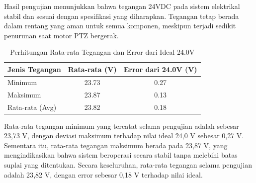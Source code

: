 Hasil pengujian menunjukkan bahwa tegangan 24VDC pada sistem elektrikal stabil
dan sesuai dengan spesifikasi yang diharapkan. Tegangan tetap berada dalam rentang
yang aman untuk semua komponen, meskipun terjadi sedikit penurunan saat motor
PTZ bergerak. 

\begin{table}[H]
	\centering
	\caption{Perhitungan Rata-rata Tegangan dan Error dari Ideal 24.0V}
	\label{tab:rata_rata_error}
	\begin{tabular}{|l|c|c|}
		\hline
		\textbf{Jenis Tegangan} & \textbf{Rata-rata (V)} & \textbf{Error dari 24.0V (V)} \\
		\hline
		Minimum                 & 23.73                  & 0.27                          \\
		Maksimum                & 23.87                  & 0.13                          \\
		Rata-rata (Avg)         & 23.82                  & 0.18                          \\
		\hline
	\end{tabular}
\end{table}

Rata-rata tegangan minimum yang tercatat selama pengujian adalah sebesar 23{,}73
V, dengan deviasi maksimum terhadap nilai ideal 24,0 V sebesar 0{,}27 V. Sementara itu, rata-rata tegangan maksimum berada
pada 23{,}87 V, yang mengindikasikan bahwa sistem beroperasi secara stabil tanpa
melebihi batas suplai yang ditentukan. Secara keseluruhan, rata-rata tegangan selama
pengujian adalah 23{,}82 V, dengan error sebesar 0{,}18 V terhadap nilai ideal.

